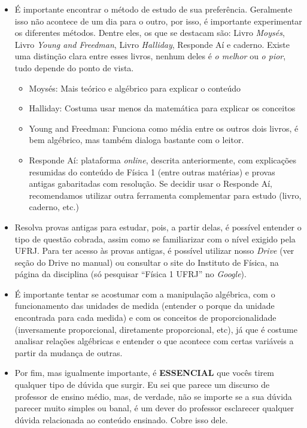 			\begin{itemize}
        		\item É importante encontrar o método de estudo de sua preferência. Geralmente isso não acontece de um dia para o outro, por isso, é importante experimentar os diferentes métodos. Dentre eles, os que se destacam são: Livro \textit{Moysés}, Livro \textit{Young and Freedman}, Livro \textit{Halliday}, Responde Aí e caderno. Existe uma distinção clara entre esses livros, nenhum deles é \textit{o melhor} ou \textit{o pior}, tudo depende do ponto de vista.
                \begin{itemize}
                	\item Moysés: Mais teórico e algébrico para explicar o conteúdo
                	\item Halliday: Costuma usar menos da matemática para explicar os conceitos
                    \item Young and Freedman: Funciona como média entre os outros dois livros, é bem algébrico, mas também dialoga bastante com o leitor.
                	\item Responde Aí: plataforma \textit{online}, descrita anteriormente, com explicações resumidas do conteúdo de Física 1 (entre outras matérias) e provas antigas gabaritadas com resolução. Se decidir usar o Responde Aí, recomendamos utilizar outra ferramenta complementar para estudo (livro, caderno, etc.)
                \end{itemize}
        		\item Resolva provas antigas para estudar, pois, a partir delas, é possível entender o tipo de questão cobrada, assim como se familiarizar com o nível exigido pela UFRJ. Para ter acesso às provas antigas, é possível utilizar nosso \textit{Drive} (ver seção do Drive no manual) ou consultar o site do Instituto de Física, na página da disciplina (só pesquisar ``Física 1 UFRJ'' no \textit{Google}).
                \item É importante tentar se acostumar com a manipulação algébrica, com o funcionamento das unidades de medida (entender o porque da unidade encontrada para cada medida) e com os conceitos de proporcionalidade (inversamente proporcional, diretamente proporcional, etc), já que é costume analisar relações algébricas e entender o que acontece com certas variáveis a partir da mudança de outras.
            	 \item Por fim, mas igualmente importante, é \textbf{ESSENCIAL} que vocês tirem qualquer tipo de dúvida que surgir. Eu sei que parece um discurso de professor de ensino médio, mas, de verdade, não se importe se a sua dúvida parecer muito simples ou banal, é um dever do professor esclarecer qualquer dúvida relacionada ao conteúdo ensinado. Cobre isso dele. 
        	\end{itemize}  
            
